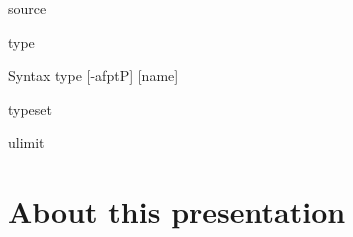 \documentclass[10pt, compress, aspectratio=169]{beamer}
\begin{document}
\begin{frame}{source}
\end{frame}

\begin{frame}{type}
  \begin{alertblock}{Syntax}
    type [-afptP] [name]
  \end{alertblock}
\end{frame}

\begin{frame}{typeset}
\end{frame}

\begin{frame}{ulimit}
\end{frame}

\section{About this presentation}
\begin{frame}[standout]
   \begin{center}\ccbysa\end{center}
\end{frame}

\maketitle
\end{document}
